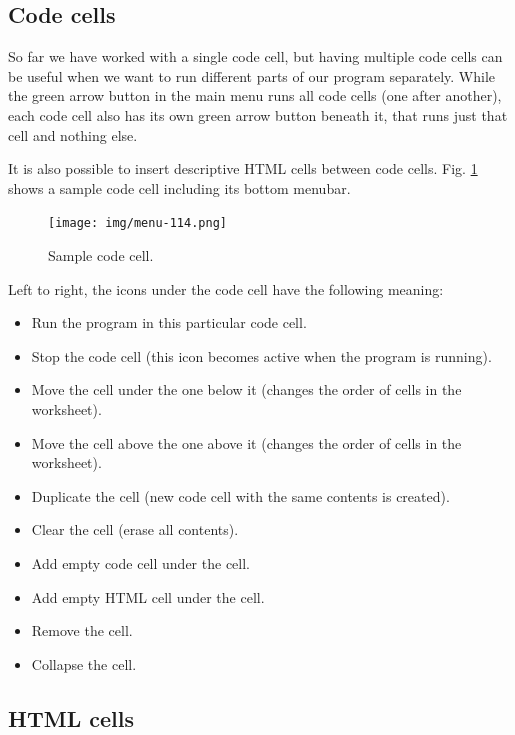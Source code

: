 \subsection{Code cells}

So far we have worked with a single code cell, but having multiple code cells 
can be useful when we want to run different parts of our program separately. 
While the green arrow button in the main menu runs all code cells (one after another), 
each code cell also has its own green arrow button beneath it, that runs just that cell
and nothing else. 

It is also possible to insert descriptive HTML cells between code cells. 
Fig. \ref{fig:menu-111} shows a sample code cell including its bottom menubar. 

\begin{figure}[!ht]
\begin{center}
\texttt{[image: img/menu-114.png]}
\caption{Sample code cell.}
\label{fig:menu-111}
\end{center}
\end{figure}

\noindent
Left to right, the icons under the code cell have the following meaning: 
\begin{itemize}
\item Run the program in this particular code cell.
\item Stop the code cell (this icon becomes active when the program is running).
\item Move the cell under the one below it (changes the order of cells in the worksheet).
\item Move the cell above the one above it (changes the order of cells in the worksheet).
\item Duplicate the cell (new code cell with the same contents is created).
\item Clear the cell (erase all contents).
\item Add empty code cell under the cell.
\item Add empty HTML cell under the cell.
\item Remove the cell.
\item Collapse the cell. 
\end{itemize}

\subsection{HTML cells}

